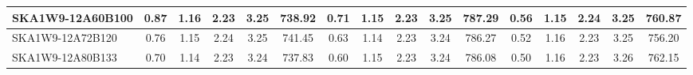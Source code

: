 \begin{table}[H]
{{\begin{tabular}{|lccccc||ccccc||ccccc|}
SKA1W9-12A60B100 & 0.87 \cellcolor{blue!46.73} & 1.16 \cellcolor{red!32.53} & 2.23 \cellcolor{green!25.07} & 3.25 \cellcolor{orange!43.96} & 738.92 \cellcolor{purple!37.67} & 0.71 \cellcolor{blue!45.91} & 1.15 \cellcolor{red!21.43} & 2.23 \cellcolor{green!49.61} & 3.25 \cellcolor{orange!60.00} & 787.29 \cellcolor{purple!36.28} & 0.56 \cellcolor{blue!48.33} & 1.15 \cellcolor{red!29.39} & 2.24 \cellcolor{green!54.84} & 3.25 \cellcolor{orange!26.49} & 760.87 \cellcolor{purple!50.98}\\ \hline 
SKA1W9-12A72B120 & 0.76 \cellcolor{blue!28.09} & 1.15 \cellcolor{red!20.87} & 2.24 \cellcolor{green!59.56} & 3.25 \cellcolor{orange!49.38} & 741.45 \cellcolor{purple!50.58} & 0.63 \cellcolor{blue!26.01} & 1.14 \cellcolor{red!18.00} & 2.23 \cellcolor{green!24.77} & 3.24 \cellcolor{orange!27.28} & 786.27 \cellcolor{purple!20.84} & 0.52 \cellcolor{blue!29.78} & 1.16 \cellcolor{red!42.80} & 2.23 \cellcolor{green!18.00} & 3.25 \cellcolor{orange!18.00} & 756.20 \cellcolor{purple!18.00}\\ \hline 
SKA1W9-12A80B133 & 0.70 \cellcolor{blue!18.00} & 1.14 \cellcolor{red!18.00} & 2.23 \cellcolor{green!40.55} & 3.24 \cellcolor{orange!18.00} & 737.83 \cellcolor{purple!32.15} & 0.60 \cellcolor{blue!18.56} & 1.15 \cellcolor{red!26.99} & 2.23 \cellcolor{green!18.00} & 3.24 \cellcolor{orange!18.00} & 786.08 \cellcolor{purple!18.00} & 0.50 \cellcolor{blue!18.00} & 1.16 \cellcolor{red!46.59} & 2.23 \cellcolor{green!35.32} & 3.26 \cellcolor{orange!60.00} & 762.15 \cellcolor{purple!60.00}\\ \hline 
\end{tabular}}
\vspace{-0.300000cm}
\hspace{1cm} 
}
\end{table}
